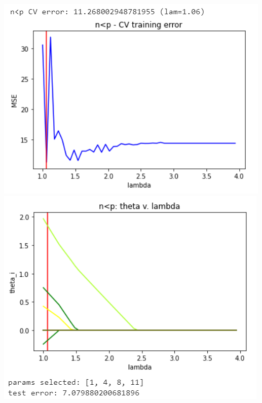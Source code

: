 \documentclass[11pt]{article}
\begin{document}
\begin{center}
\includegraphics[scale=0.7]{charts/ridge_st_ortho_n_lt_p_err.PNG}
\includegraphics[scale=0.7]{charts/ridge_st_ortho_n_lt_p_thetas.PNG}


\end{center}
\end{document}

